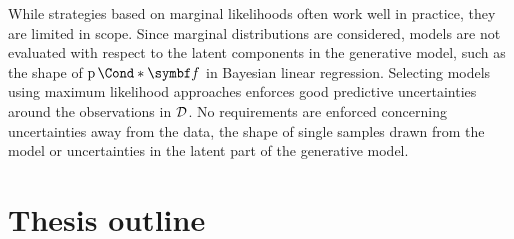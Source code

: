 While strategies based on marginal likelihoods often work well in practice, they are limited in scope.
Since marginal distributions are considered, models are not evaluated with respect to the latent components in the generative model, such as the shape of $\Prob*{\mat{f}}$ in Bayesian linear regression.
Selecting models using maximum likelihood approaches enforces good predictive uncertainties around the observations in $\mathcal{D}$.
No requirements are enforced concerning uncertainties away from the data, the shape of single samples drawn from the model or uncertainties in the latent part of the generative model.


\section{Thesis outline}

